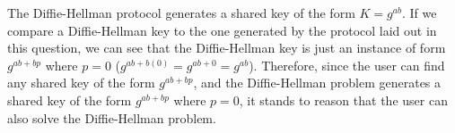 \documentclass[11pt]{article}
\theoremstyle{definition}
\newcounter{problem}
\begin{document}
\begin{enumerate}
\begin{enumerate}
The Diffie-Hellman protocol generates a shared key of the form $K = g^{ab}$. If we compare a Diffie-Hellman key to the one generated by the protocol laid out in this question, we can see that the Diffie-Hellman key is just an instance of form $g^{ab + bp}$ where $p = 0$ ($g^{ab + b(0)} = g^{ab + 0} = g^{ab}$). Therefore, since the user can find any shared key of the form $g^{ab + bp}$, and the Diffie-Hellman problem generates a shared key of the form $g^{ab + bp}$ where $p = 0$, it stands to reason that the user can also solve the Diffie-Hellman problem.
\end{enumerate}

\end{enumerate}
\end{document}
